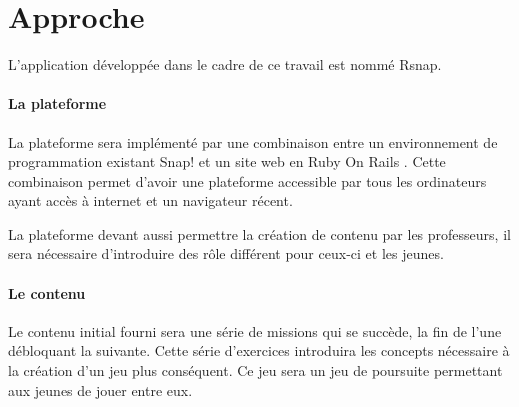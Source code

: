 \section{Approche}
\label{intro-approche}
L'application développée dans le cadre de ce travail est nommé Rsnap.

\paragraph{La plateforme} La plateforme sera implémenté par une combinaison entre un environnement de programmation existant Snap! \cite{snap} et un site web en Ruby On Rails \cite{rails}. Cette combinaison permet d'avoir une plateforme accessible par tous les ordinateurs ayant accès à internet et un navigateur récent.

La plateforme devant aussi permettre la création de contenu par les professeurs, il sera nécessaire d'introduire des rôle différent pour ceux-ci et les jeunes.

\paragraph{Le contenu} Le contenu initial fourni sera une série de missions qui se succède, la fin de l'une débloquant la suivante. Cette série d'exercices introduira les concepts nécessaire à la création d'un jeu plus conséquent. Ce jeu sera un jeu de poursuite permettant aux jeunes de jouer entre eux.
